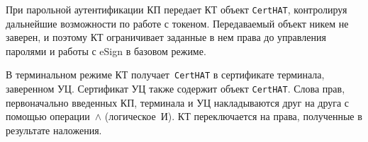 При парольной аутентификации КП передает КТ объект \texttt{CertHAT},
контролируя дальнейшие возможности по работе с токеном. Передаваемый объект 
никем не заверен, и поэтому КТ ограничивает заданные в нем права до управления 
паролями и работы с eSign в базовом режиме. 

В терминальном режиме КТ получает~\texttt{CertHAT} в сертификате терминала, 
заверенном УЦ. Сертификат УЦ также содержит объект \texttt{CertHAT}.
Слова прав, первоначально введенных КП, терминала и УЦ накладываются 
друг на друга с помощью операции~$\wedge$ (логическое~И). 
КТ переключается на права, полученные в результате наложения.


